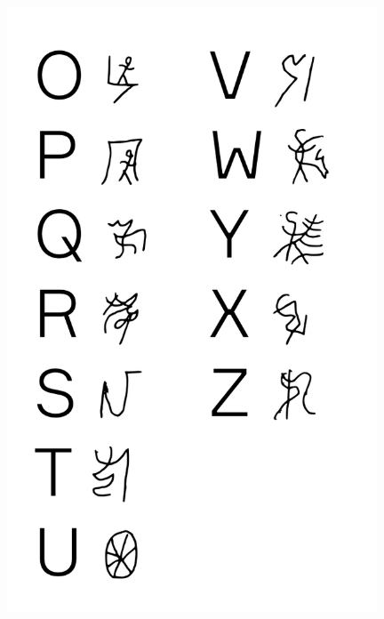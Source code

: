 \makeatletter\@openrightfalse
\begin{absolutelynopagebreak}
\begin{vplace}
\begin{figure}[H]
\begin{adjustwidth}{-0.99cm}{}
  \centering
  \vspace*{-2cm}
  \hspace*{0.4cm}
  \includegraphics[width=110mm]{./imgs/alfa4.pdf}  
  \hfill
\end{adjustwidth}

\thispagestyle{empty}

\end{figure}
\end{vplace}

\end{absolutelynopagebreak}

